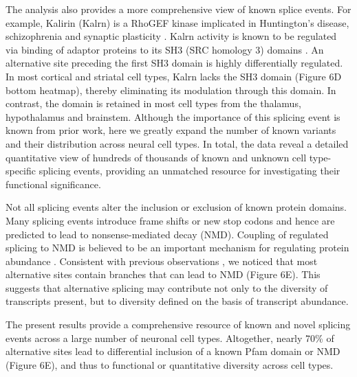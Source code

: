 The analysis also provides a more comprehensive view of known splice events. For example, Kalirin (Kalrn) is a RhoGEF kinase implicated in Huntington's disease, schizophrenia and synaptic plasticity \citep{Penzes_2008}. Kalrn activity is known to be regulated via binding of adaptor proteins to its SH3 (SRC homology 3) domains \citep{Schiller_2006}. An alternative site preceding the first SH3 domain is highly differentially regulated. In most cortical and striatal cell types, Kalrn lacks the SH3 domain (Figure 6D bottom heatmap), thereby eliminating its modulation through this domain. In contrast, the domain is retained in most cell types from the thalamus, hypothalamus and brainstem. Although the importance of this splicing event is known from prior work, here we greatly expand the number of known variants and their distribution across neural cell types. In total, the data reveal a detailed quantitative view of hundreds of thousands of known and unknown cell type-specific splicing events, providing an unmatched resource for investigating their functional significance.

Not all splicing events alter the inclusion or exclusion of known protein domains. Many splicing events introduce frame shifts or new stop codons and hence are predicted to lead to nonsense-mediated decay (NMD). Coupling of regulated splicing to NMD is believed to be an important mechanism for regulating protein abundance \cite{Lewis_2002}. Consistent with previous observations \citep{Yan_2015}, we noticed that most alternative sites contain branches that can lead to NMD (Figure 6E). This suggests that alternative splicing may contribute not only to the diversity of transcripts present, but to diversity defined on the basis of transcript abundance. 

The present results provide a comprehensive resource of known and novel splicing events across a large number of neuronal cell types. Altogether, nearly 70\% of alternative sites lead to differential inclusion of a known Pfam domain or NMD (Figure 6E), and thus to functional or quantitative diversity across cell types.
